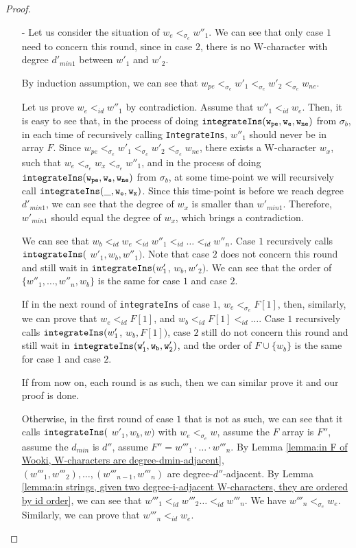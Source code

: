 \begin {proof}
\begin{itemize}
    \begin{itemize}
    \setlength{\itemsep}{0.5pt}
    \item[-] Let us consider the situation of $w_e <_{\sigma_e} w''_1$. We can see that only case $1$ need to concern this round, since in case $2$, there is no W-character with degree $d'_{min1}$ between $w'_1$ and $w'_2$.

        By induction assumption, we can see that $w_{pe} <_{\sigma_e} w'_1 <_{\sigma_e} w'_2 <_{\sigma_e} w_{ne}$.

        Let us prove $w_e <_{id} w''_1$ by contradiction. Assume that $w''_1 <_{id} w_e$. Then, it is easy to see that, in the process of doing $\alabelshort[{\tt integrateIns}]{w_{pe},w_e,w_{ne}}$ from $\sigma_b$, in each time of recursively calling {\tt IntegrateIns}, $w''_1$ should never be in array $F$. Since $w_{pe} <_{\sigma_e} w'_1 <_{\sigma_e} w'_2 <_{\sigma_e} w_{ne}$, there exists a W-character $w_x$, such that $w_e <_{\sigma_e} w_x <_{\sigma_e} w''_1$, and in the process of doing $\alabelshort[{\tt integrateIns}]{w_{pe},w_e,w_{ne}}$ from $\sigma_b$, at some time-point we will recursively call $\alabelshort[{\tt integrateIns}]{\_,w_e,w_x}$. Since this time-point is before we reach degree $d'_{min1}$, we can see that the degree of $w_x$ is smaller than $w'_{min1}$. Therefore, $w'_{min1}$ should equal the degree of $w_x$, which brings a contradiction.

        We can see that $w_b <_{id} w_e <_{id} w''_1 <_{id} \ldots <_{id} w''_n$. Case $1$ recursively calls ${\tt integrateIns(}$ $w'_1,w_b,w''_1)$. Note that case $2$ does not concern this round and still wait in ${\tt integrateIns}(w'_1$, $w_b,w'_2)$. We can see that the order of $\{ w''_1,\ldots,w''_n,w_b \}$ is the same for case $1$ and case $2$.

        If in the next round of {\tt integrateIns} of case $1$, $w_e <_{\sigma_e} F[1]$, then, similarly, we can prove that $w_e <_{id} F[1]$, and $w_b <_{id} F[1] <_{id}\ldots$. Case $1$ recursively calls ${\tt integrateIns}(w'_1$, $w_b,F[1])$, case $2$ still do not concern this round and still wait in $\alabelshort[{\tt integrateIns}]{w'_1,w_b,w'_2}$, and the order of $F \cup \{ w_b \}$ is the same for case $1$ and case $2$.

        If from now on, each round is as such, then we can similar prove it and our proof is done.

        Otherwise, in the first round of case $1$ that is not as such, we can see that it calls ${\tt integrateIns(}$ $w'_1,w_b,w)$ with $w_e <_{\sigma_e} w$, assume the $F$ array is $F''$, assume the $d_{min}$ is $d''$, assume $F'' = w'''_1 \cdot \ldots \cdot w'''_n$. By Lemma \ref{lemma:in F of Wooki, W-characters are degree-dmin-adjacent}, $(w'''_1,w'''_2),\ldots,(w'''_{n-1},w'''_n)$ are degree-$d''$-adjacent. By Lemma \ref{lemma:in strings, given two degree-i-adjacent W-characters, they are ordered by id order}, we can see that $w'''_1 <_{id} w'''_2 \ldots <_{id} w'''_n$. We have $w'''_n <_{\sigma_e} w_e$. Similarly, we can prove that $w'''_n <_{id} w_e$.


\end{itemize}
\end{itemize}
\end{proof}

